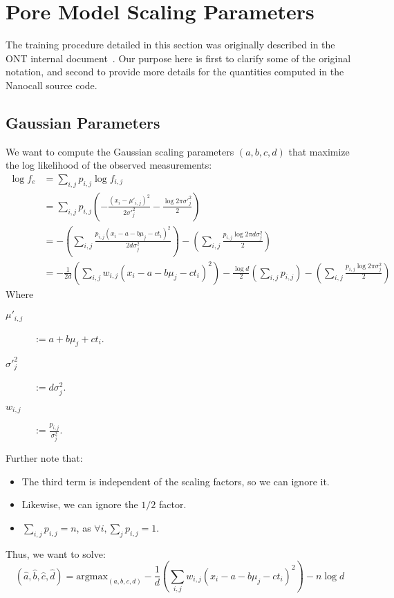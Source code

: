 \documentclass{article}
\begin{document}
\section{Pore Model Scaling Parameters}
\label{scaling-sec}

The training procedure detailed in this section was originally described in the ONT internal document~\cite{ont-calibration}. Our purpose here is first to clarify some of the original notation, and second to provide more details for the quantities computed in the Nanocall source code.

\subsection{Gaussian Parameters}

We want to compute the Gaussian scaling parameters $(a,b,c,d)$ that maximize the log likelihood of the observed measurements:
\begin{align*}
\log f_e & = \sum_{i,j} p_{i,j} \log f_{i,j}
\\
& = \sum_{i,j} p_{i,j} \left( - \frac{(x_i - \mu'_{i,j})^2}{2 \sigma'^2_j} - \frac{\log 2 \pi \sigma'^2_j}{2} \right)
\\
& = - \left( \sum_{i,j} \frac{p_{i,j} \left( x_i - a - b \mu_j - c t_i \right)^2}{2 d \sigma^2_j} \right)
- \left( \sum_{i,j} \frac{p_{i,j} \log 2 \pi d \sigma^2_j}{2} \right)
\\
& = - \frac{1}{2d} \left( \sum_{i,j} w_{i,j} \left( x_i - a - b \mu_j - c t_i \right)^2 \right)
- \frac{\log d}{2} \left( \sum_{i,j} p_{i,j} \right)
- \left( \sum_{i,j} \frac{p_{i,j} \log 2 \pi \sigma^2_j}{2} \right)
\end{align*}
Where
\begin{description}
\item[$\mu'_{i,j}$] $:= a + b \mu_j + c t_i$.
\item[$\sigma'^2_j$] $:= d \sigma^2_j$.
\item[$w_{i,j}$] $:= \frac{p_{i,j}}{\sigma_j^2}$.
\end{description}
Further note that:
\begin{itemize}
\item The third term is independent of the scaling factors, so we can ignore it.
\item Likewise, we can ignore the $1/2$ factor.
\item $\sum_{i,j} p_{i,j} = n$, as $\forall i, \sum_j p_{i,j} = 1$.
\end{itemize}
Thus, we want to solve:
\[
(\hat{a}, \hat{b}, \hat{c}, \hat{d}) = \mathrm{argmax}_{(a,b,c,d)} 
- \frac{1}{d} \left( \sum_{i,j} w_{i,j} \left( x_i - a - b \mu_j - c t_i \right)^2 \right) - n \log d
\]
\end{document}
